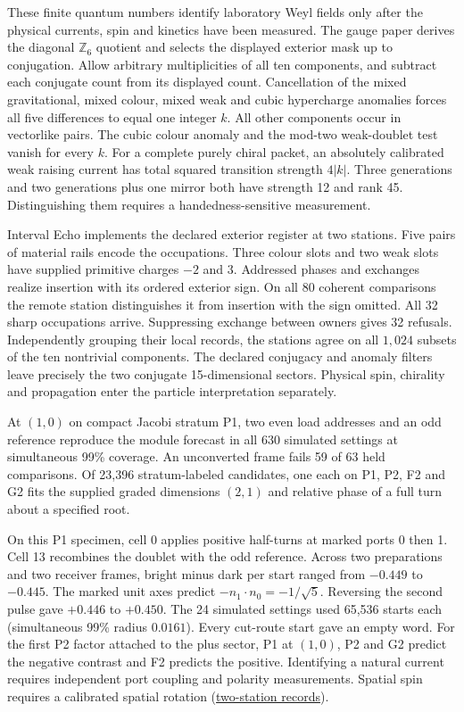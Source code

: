 \documentclass[11pt]{article}
\begin{document}
These finite quantum numbers identify laboratory Weyl fields only after the
physical currents, spin and kinetics have been measured. The gauge paper
\cite{ophGauge} derives the diagonal $\mathbb Z_6$ quotient and selects the
displayed exterior mask up to conjugation. Allow arbitrary multiplicities of
all ten components, and subtract each conjugate count from its displayed
count. Cancellation of the mixed gravitational, mixed colour, mixed weak and cubic
hypercharge anomalies forces all five differences to equal one integer $k$.
All other components occur in vectorlike pairs. The cubic colour anomaly
and the mod-two weak-doublet test vanish for every $k$.
For a complete purely chiral packet, an absolutely calibrated weak raising
current has total squared transition strength $4|k|$. Three generations and
two generations plus one mirror both have strength 12 and rank 45.
Distinguishing them requires a handedness-sensitive measurement.

Interval Echo implements the declared exterior register at two stations.
Five pairs of material rails encode the occupations. Three colour slots
and two weak slots have supplied primitive charges $-2$ and $3$.
Addressed phases and exchanges realize insertion with its ordered
exterior sign. On all 80 coherent comparisons the remote station
distinguishes it from insertion with the sign omitted. All 32 sharp
occupations arrive. Suppressing exchange between owners gives 32
refusals. Independently grouping their local records, the stations agree
on all $1{,}024$ subsets of the ten nontrivial components. The declared
conjugacy and anomaly filters leave precisely the two conjugate
15-dimensional sectors. Physical spin, chirality and propagation enter
the particle interpretation separately.

At $(1,0)$ on compact Jacobi stratum P1, two even load addresses and an
odd reference reproduce the module forecast in all 630 simulated settings
at simultaneous 99\% coverage. An unconverted frame fails 59 of 63 held
comparisons. Of 23,396 stratum-labeled candidates, one each on P1, P2, F2
and G2 fits the supplied graded dimensions $(2,1)$ and relative phase of
a full turn about a specified root.

On this P1 specimen, cell 0 applies positive half-turns at marked ports
0 then 1. Cell 13 recombines the doublet with the odd reference. Across
two preparations and two receiver frames, bright minus dark per start
ranged from $-0.449$ to $-0.445$. The marked unit axes predict
$-n_1\cdot n_0=-1/\sqrt5$. Reversing the second pulse gave
$+0.446$ to $+0.450$. The 24 simulated settings used 65,536 starts each
(simultaneous 99\% radius $0.0161$). Every cut-route start gave an empty
word. For the first P2 factor attached to the plus sector, P1 at $(1,0)$,
P2 and G2 predict the negative contrast and F2 predicts the positive.
Identifying a natural current requires independent port coupling and
polarity measurements. Spatial spin requires a calibrated spatial rotation
(\href{https://github.com/FloatingPragma/observer-patch-holography/tree/main/model/experiments/interval_echo_gauge/matter_class}{two-station records}).
\end{document}

